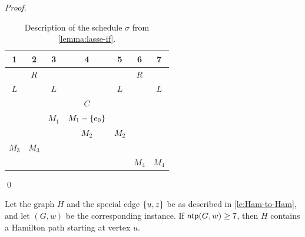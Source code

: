 \begin{proof}
\begin{table}[htpb]
\begin{tabular}{ c | c | c | c | c | c | c }
	1 & 2 & 3 & 4 & 5 & 6 & 7 \\
	\hline
	 & $R$ & & & & $R$ & \\
	 $L$ & & $L$ & & $L$ &  & $L$ \\
	 & & & $C$ & & &  \\
	 & & $M_1$ & $M_1 - \{ e_0 \}$  & & &  \\
	  & & & $M_2$  & $M_2$ & &  \\
	  $M_3$ & $M_3$ & &  &  & &  \\
	   & & &  &  & $M_4$ & $M_4$ 
 \end{tabular}
 \caption{Description of the schedule $\sigma$ from \cref{lemma:lasse-if}.}
 \label{table:lasse-if}
\end{table}
\qed
\end{proof}

\begin{lemma}
\label{lemma:lasse-only-if}
Let the graph $H$ and the special edge $\{ u,z \}$ be as described in \cref{le:Ham-to-Ham}, and let $(G, w)$ be the corresponding {\xxxNTP} instance. If $\operatorname{\textsf{ntp}}(G, w) \geq 7$, then $H$ contains a Hamilton path starting at vertex $u$.
\end{lemma}
